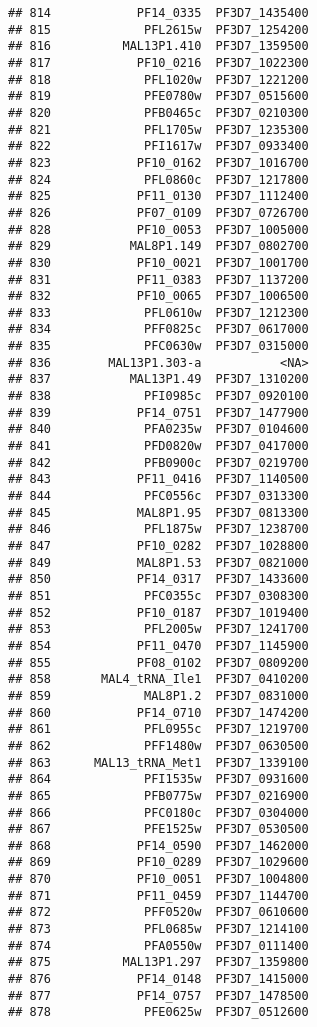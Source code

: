 \documentclass{article}\usepackage[]{graphicx}\usepackage[]{color}
\makeatletter
\newenvironment{kframe}{%
 \def\at@end@of@kframe{}%
 \ifinner\ifhmode%
  \def\at@end@of@kframe{\end{minipage}}%
  \begin{minipage}{\columnwidth}%
 \fi\fi%
 \def\FrameCommand##1{\hskip\@totalleftmargin \hskip-\fboxsep
 \colorbox{shadecolor}{##1}\hskip-\fboxsep
     \hskip-\linewidth \hskip-\@totalleftmargin \hskip\columnwidth}%
 \MakeFramed {\advance\hsize-\width
   \@totalleftmargin\z@ \linewidth\hsize
   \@setminipage}}%
 {\par\unskip\endMakeFramed%
 \at@end@of@kframe}
\newenvironment{knitrout}{}{} %
\makeatother
\begin{document}
\begin{knitrout}
\begin{kframe}
\begin{verbatim}
## 814            PF14_0335  PF3D7_1435400
## 815             PFL2615w  PF3D7_1254200
## 816          MAL13P1.410  PF3D7_1359500
## 817            PF10_0216  PF3D7_1022300
## 818             PFL1020w  PF3D7_1221200
## 819             PFE0780w  PF3D7_0515600
## 820             PFB0465c  PF3D7_0210300
## 821             PFL1705w  PF3D7_1235300
## 822             PFI1617w  PF3D7_0933400
## 823            PF10_0162  PF3D7_1016700
## 824             PFL0860c  PF3D7_1217800
## 825            PF11_0130  PF3D7_1112400
## 826            PF07_0109  PF3D7_0726700
## 828            PF10_0053  PF3D7_1005000
## 829           MAL8P1.149  PF3D7_0802700
## 830            PF10_0021  PF3D7_1001700
## 831            PF11_0383  PF3D7_1137200
## 832            PF10_0065  PF3D7_1006500
## 833             PFL0610w  PF3D7_1212300
## 834             PFF0825c  PF3D7_0617000
## 835             PFC0630w  PF3D7_0315000
## 836        MAL13P1.303-a           <NA>
## 837           MAL13P1.49  PF3D7_1310200
## 838             PFI0985c  PF3D7_0920100
## 839            PF14_0751  PF3D7_1477900
## 840             PFA0235w  PF3D7_0104600
## 841             PFD0820w  PF3D7_0417000
## 842             PFB0900c  PF3D7_0219700
## 843            PF11_0416  PF3D7_1140500
## 844             PFC0556c  PF3D7_0313300
## 845            MAL8P1.95  PF3D7_0813300
## 846             PFL1875w  PF3D7_1238700
## 847            PF10_0282  PF3D7_1028800
## 849            MAL8P1.53  PF3D7_0821000
## 850            PF14_0317  PF3D7_1433600
## 851             PFC0355c  PF3D7_0308300
## 852            PF10_0187  PF3D7_1019400
## 853             PFL2005w  PF3D7_1241700
## 854            PF11_0470  PF3D7_1145900
## 855            PF08_0102  PF3D7_0809200
## 858       MAL4_tRNA_Ile1  PF3D7_0410200
## 859             MAL8P1.2  PF3D7_0831000
## 860            PF14_0710  PF3D7_1474200
## 861             PFL0955c  PF3D7_1219700
## 862             PFF1480w  PF3D7_0630500
## 863      MAL13_tRNA_Met1  PF3D7_1339100
## 864             PFI1535w  PF3D7_0931600
## 865             PFB0775w  PF3D7_0216900
## 866             PFC0180c  PF3D7_0304000
## 867             PFE1525w  PF3D7_0530500
## 868            PF14_0590  PF3D7_1462000
## 869            PF10_0289  PF3D7_1029600
## 870            PF10_0051  PF3D7_1004800
## 871            PF11_0459  PF3D7_1144700
## 872             PFF0520w  PF3D7_0610600
## 873             PFL0685w  PF3D7_1214100
## 874             PFA0550w  PF3D7_0111400
## 875          MAL13P1.297  PF3D7_1359800
## 876            PF14_0148  PF3D7_1415000
## 877            PF14_0757  PF3D7_1478500
## 878             PFE0625w  PF3D7_0512600

\end{verbatim}
\end{kframe}
\end{knitrout}
\end{document}
